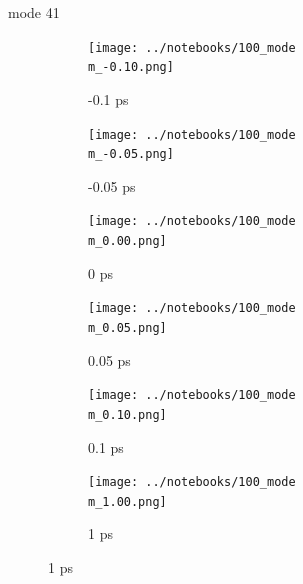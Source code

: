 \documentclass{beamer}
\begin{document}
\renewcommand\m{41}
\begin{frame}{mode \m}
	\begin{figure}
		\centering
		\begin{subfigure}[b]{\w\textwidth}
			\centering
			\texttt{[image: ../notebooks/100\_mode\\m\_-0.10.png]}
			\caption{-0.1 ps}
		\end{subfigure}
		\begin{subfigure}[b]{\w\textwidth}
			\centering
			\texttt{[image: ../notebooks/100\_mode\\m\_-0.05.png]}
			\caption{-0.05 ps}
		\end{subfigure}
		\begin{subfigure}[b]{\w\textwidth}
			\centering
			\texttt{[image: ../notebooks/100\_mode\\m\_0.00.png]}
			\caption{0 ps}
		\end{subfigure}
		\begin{subfigure}[b]{\w\textwidth}
			\centering
			\texttt{[image: ../notebooks/100\_mode\\m\_0.05.png]}
			\caption{0.05 ps}
		\end{subfigure}
		\begin{subfigure}[b]{\w\textwidth}
			\centering
			\texttt{[image: ../notebooks/100\_mode\\m\_0.10.png]}
			\caption{0.1 ps}
		\end{subfigure}
		\begin{subfigure}[b]{\w\textwidth}
			\centering
			\texttt{[image: ../notebooks/100\_mode\\m\_1.00.png]}
			\caption{1 ps}
		\end{subfigure}
	\end{figure}
\end{frame}
\end{document}
